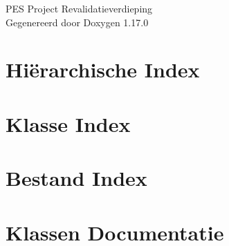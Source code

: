 \documentclass[twoside]{book}
\newcommand{\+}{\discretionary{\mbox{\scriptsize$\hookleftarrow$}}{}{}}
\newcommand{\clearemptydoublepage}{%
    \newpage{\pagestyle{empty}\cleardoublepage}%
  }
\begin{document}
  \raggedbottom
    \hypersetup{pageanchor=false,
                bookmarksnumbered=true,
                pdfencoding=unicode
               }
  \begin{titlepage}
  \vspace*{7cm}
  \begin{center}%
  {\Large PES Project Revalidatieverdieping}\\
  \vspace*{1cm}
  {\large Gegenereerd door Doxygen 1.17.0}\\
  \end{center}
  \end{titlepage}
  \clearemptydoublepage
  \tableofcontents
  \clearemptydoublepage
  \hypersetup{pageanchor=true}
\chapter{Hiërarchische Index}

\chapter{Klasse Index}

\chapter{Bestand Index}

\chapter{Klassen Documentatie}













































\end{document}
